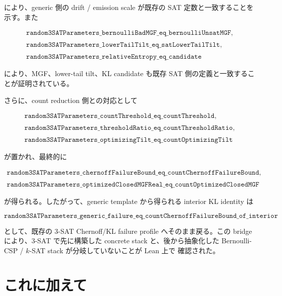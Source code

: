 \documentclass[12pt,a4paper]{article}
\begin{document}
により、generic 側の drift / emission scale が既存の SAT 定数と一致することを示す。また

\[
\begin{aligned}
\texttt{random3SATParameters\_bernoulliBadMGF\_eq\_bernoulliUnsatMGF}, \\
\qquad \\
\texttt{random3SATParameters\_lowerTailTilt\_eq\_satLowerTailTilt}, \\
\qquad \\
\texttt{random3SATParameters\_relativeEntropy\_eq\_candidate}
\end{aligned}
\]

により、MGF、lower-tail tilt、KL candidate も既存 SAT 側の定義と一致することが証明されている。

さらに、count reduction 側との対応として

\[
\begin{aligned}
\texttt{random3SATParameters\_countThreshold\_eq\_countThreshold}, \\
\quad \\
\texttt{random3SATParameters\_thresholdRatio\_eq\_countThresholdRatio}, \\
\quad \\
\texttt{random3SATParameters\_optimizingTilt\_eq\_countOptimizingTilt}
\end{aligned}
\]

が置かれ、最終的に

\[
\begin{aligned}
\texttt{random3SATParameters\_chernoffFailureBound\_eq\_countChernoffFailureBound}, \\
\qquad \\
\texttt{random3SATParameters\_optimizedClosedMGFReal\_eq\_countOptimizedClosedMGF}
\end{aligned}
\]

が得られる。したがって、generic template から得られる interior KL identity は

\[
\texttt{random3SATParameters\_generic\_failure\_eq\_countChernoffFailureBound\_of\_interior}
\]

として、既存の 3-SAT Chernoff/KL failure profile へそのまま戻る。この bridge により、3-SAT で先に構築した concrete stack と、後から抽象化した Bernoulli-CSP / \(k\)-SAT stack が分岐していないことが Lean 上で 確認された。

\section{これに加えて}\label{ux3053ux308cux306bux52a0ux3048ux3066}
\end{document}
